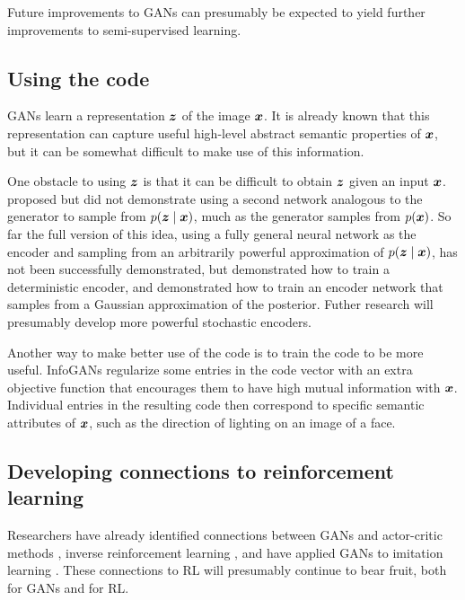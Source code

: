  Future improvements to GANs can presumably be expected to yield further
 improvements to semi-supervised learning.

 \subsection{Using the code}

 GANs learn a representation ${\bm{z}}$ of the image ${\bm{x}}$.
 It is already known that this representation can capture useful high-level
 abstract semantic properties of ${\bm{x}}$, but it can be somewhat difficult
 to make use of this information.

One obstacle to using ${\bm{z}}$ is that it can be difficult to obtain
${\bm{z}}$ given an input ${\bm{x}}$.
\citet{Goodfellow-et-al-NIPS2014-small} proposed but did not demonstrate
using a second network analogous to the generator to sample from $p({\bm{z}} \mid {\bm{x}})$,
much as the generator samples from $p({\bm{x}})$.
So far the full version of this idea, using a fully general neural network as the
encoder and sampling from an arbitrarily powerful approximation of $p({\bm{z}} \mid {\bm{x}})$,
has not been successfully demonstrated,
but
\citet{donahue2016adversarial} demonstrated how to train a deterministic encoder,
and \citet{dumoulin2016adversarially} demonstrated how to train an encoder
network that samples from a Gaussian approximation of the posterior.
Futher research will presumably develop more powerful stochastic encoders.

Another way to make better use of the code is to train the code to be more useful.
InfoGANs \citep{chen2016infogan} regularize some entries in the code vector with
an extra objective function that encourages them to have high mutual information
with ${\bm{x}}$. Individual entries in the resulting code then correspond to specific
semantic attributes of ${\bm{x}}$, such as the direction of lighting on an image of
a face.

\subsection{Developing connections to reinforcement learning}
\label{sec:rl_connections}

Researchers have already identified connections between GANs and
actor-critic methods \citep{pfau2016connecting}, inverse reinforcement learning \citep{finn2016connection},
and have applied GANs to imitation learning \citep{ho2016generative}.
These connections to RL will presumably continue to bear fruit, both for GANs
and for RL.

